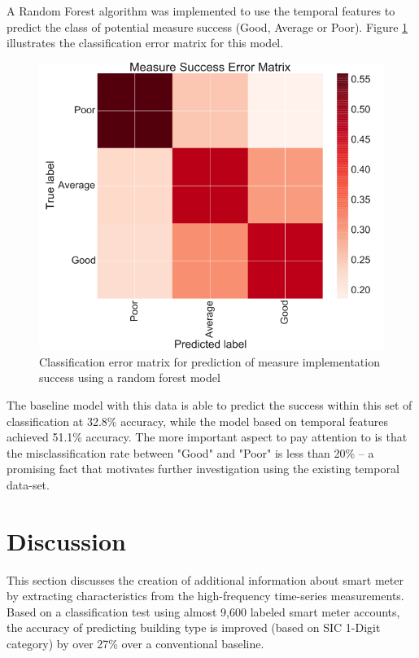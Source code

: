 A Random Forest algorithm was implemented to use the temporal features to predict the class of potential measure success (Good, Average or Poor). Figure \ref{fig:measurimp_classification} illustrates the classification error matrix for this model. 

\begin{figure}[ht!]
\begin{center}
\includegraphics[width=0.7\columnwidth]{figures/measurespredictionmatrix/measurespredictionmatrix}
\caption{{Classification error matrix for prediction of measure implementation success using a random forest model
\label{fig:measurimp_classification}%
}}
\end{center}
\end{figure}

The baseline model with this data is able to predict the success within this set of classification at 32.8\% accuracy, while the model based on temporal features achieved 51.1\% accuracy. The more important aspect to pay attention to is that the misclassification rate between "Good" and "Poor" is less than 20\% -- a promising fact that motivates further investigation using the existing temporal data-set.

\section{Discussion}
\label{sec:scalabilitydiscussion}

This section discusses the creation of additional information about smart meter by extracting characteristics from the high-frequency time-series measurements. Based on a classification test using almost 9,600 labeled smart meter accounts, the accuracy of predicting building type is improved (based on SIC 1-Digit category) by over 27\% over a conventional baseline. 

